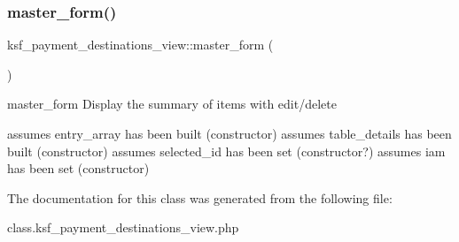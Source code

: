 \subsubsection{\texorpdfstring{master\+\_\+form()}{master\_form()}}
{\footnotesize\ttfamily ksf\+\_\+payment\+\_\+destinations\+\_\+view\+::master\+\_\+form (\begin{DoxyParamCaption}{ }\end{DoxyParamCaption})}

master\+\_\+form Display the summary of items with edit/delete

assumes entry\+\_\+array has been built (constructor) assumes table\+\_\+details has been built (constructor) assumes selected\+\_\+id has been set (constructor?) assumes iam has been set (constructor) 

The documentation for this class was generated from the following file\+:\begin{DoxyCompactItemize}
\item 
class.\+ksf\+\_\+payment\+\_\+destinations\+\_\+view.\+php\end{DoxyCompactItemize}
